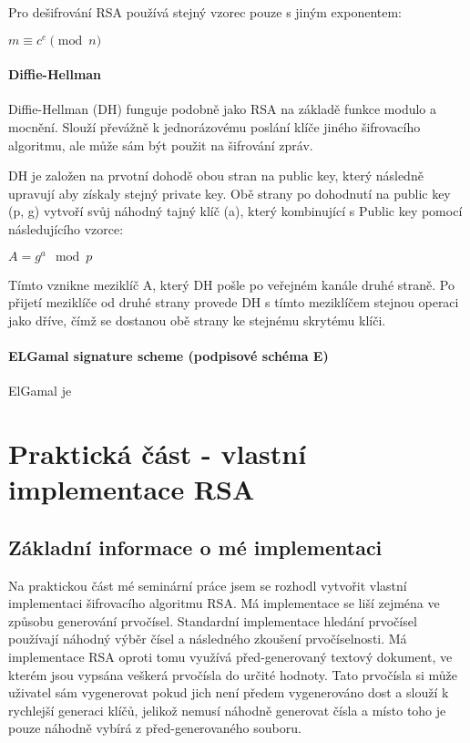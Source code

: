 \documentclass[12pt,a4paper]{report}
\begin{document}
Pro dešifrování RSA používá stejný vzorec pouze s jiným exponentem:

$ m \equiv c^e \pmod n$

\subsubsection{Diffie-Hellman}
Diffie-Hellman (DH) funguje podobně jako RSA na základě funkce modulo a mocnění. Slouží převážně k jednorázovému poslání klíče jiného šifrovacího algoritmu, ale může sám být použit na šifrování zpráv.

DH je založen na prvotní dohodě obou stran na public key, který následně upravují aby získaly stejný private key. Obě strany po dohodnutí na public key (p, g) vytvoří svůj náhodný tajný klíč (a), který kombinující s Public key pomocí následujícího vzorce:

$ A = g^a \mod p$

Tímto vznikne meziklíč A, který DH pošle po veřejném kanále druhé straně. Po přijetí meziklíče od druhé strany provede DH s tímto meziklíčem stejnou operaci jako dříve, čímž se dostanou obě strany ke stejnému skrytému klíči.

\subsubsection{ELGamal signature scheme (podpisové schéma E)}
ElGamal je 



\chapter{Praktická část - vlastní implementace RSA}

\section{Základní informace o mé implementaci}
Na praktickou část mé seminární práce jsem se rozhodl vytvořit vlastní implementaci šifrovacího algoritmu RSA. Má implementace se liší zejména ve způsobu generování prvočísel. Standardní implementace hledání prvočísel používají náhodný výběr čísel a následného zkoušení prvočíselnosti. Má implementace RSA oproti tomu využívá před-generovaný textový dokument, ve kterém jsou vypsána veškerá prvočísla do určité hodnoty. Tato prvočísla si může uživatel sám vygenerovat pokud jich není předem vygenerováno dost a slouží k rychlejší generaci klíčů, jelikož nemusí náhodně generovat čísla a místo toho je pouze náhodně vybírá z před-generovaného souboru. 
\end{document}
